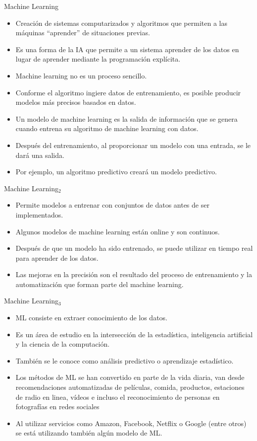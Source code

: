 \documentclass[11pt,aspectratio=169]{beamer}
\begin{document}
\begin{frame}{Machine Learning}
\begin{itemize}
	\item Creación de sistemas computarizados y algoritmos que permiten a las máquinas ``aprender'' de situaciones previas. \pause
	\item Es una forma de la IA que permite a un sistema aprender de los datos en lugar de aprender mediante la programación explícita. \pause
	\item Machine learning no es un proceso sencillo.\pause
	\item Conforme el algoritmo ingiere datos de entrenamiento, es posible producir modelos más precisos basados en datos. \pause
	\item Un modelo de machine learning es la salida de información que se genera cuando entrena su algoritmo de machine learning con datos. \pause
	\item Después del entrenamiento, al proporcionar un modelo con una entrada, se le dará una salida.\pause
	\item Por ejemplo, un algoritmo predictivo creará un modelo predictivo. 
\end{itemize}
\end{frame}

\begin{frame}{Machine Learning$_2$}
\begin{itemize}
	\item Permite modelos a entrenar con conjuntos de datos antes de ser implementados. \pause
	\item Algunos modelos de machine learning están online y son continuos. \pause
	\item Después de que un modelo ha sido entrenado, se puede utilizar en tiempo real para aprender de los datos. \pause
	\item Las mejoras en la precisión son el resultado del proceso de entrenamiento y la automatización que forman parte del machine learning.
\end{itemize}
\end{frame}

\begin{frame}{Machine Learning$_3$}
\begin{itemize}
	\item ML consiste en extraer conocimiento de los datos. \pause
	\item Es un área de estudio en la intersección de la estadística, inteligencia artificial y la ciencia de la computación.\pause
	\item También se le conoce como análisis predictivo o aprendizaje estadístico. \pause
	\item Los métodos de ML se han convertido en parte de la vida diaria, van desde recomendaciones automatizadas de películas, 
		comida, productos, estaciones de radio en linea, vídeos e incluso el reconocimiento de personas en fotografías en redes sociales\pause
	\item Al utilizar servicios como Amazon, Facebook, Netflix o Google (entre otros) se está utilizando también algún modelo de ML.
\end{itemize}
\end{frame}
\end{document}
